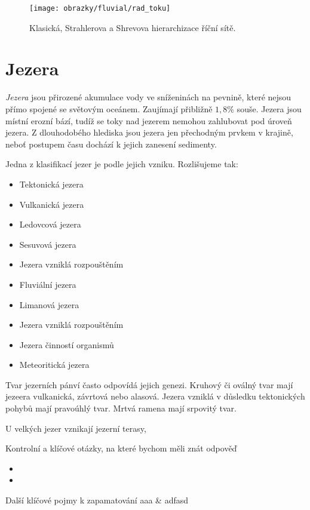 \begin{figure}
	\centering
	\texttt{[image: obrazky/fluvial/rad\_toku]}
	\caption{Klasická, Strahlerova a Shrevova hierarchizace říční sítě.}
	\label{fig:radtoku}
\end{figure}


\section{Jezera}
\emph{Jezera} jsou přirozené akumulace vody ve sníženinách na pevnině, které nejsou přímo spojené se světovým oceánem. Zaujímají přibližně $1,8 \%$ souše. Jezera jsou místní erozní bází, tudíž se toky nad jezerem nemohou zahlubovat pod úroveň jezera. Z dlouhodobého hlediska jsou jezera jen přechodným prvkem v krajině, neboť postupem času dochází k jejich zanesení sedimenty. 

Jedna z klasifikací jezer je podle jejich vzniku. Rozlišujeme tak:
\begin{itemize}
	\item Tektonická jezera	
	\item Vulkanická jezera
	\item Ledovcová jezera
	\item Sesuvová jezera
	\item Jezera vzniklá rozpouštěním
	\item Fluviální jezera
	\item Limanová jezera
	\item Jezera vzniklá rozpouštěním
	\item Jezera činností organismů
	\item Meteoritická jezera
\end{itemize}

Tvar jezerních pánví často odpovídá jejich genezi. Kruhový či oválný tvar mají jezeera vulkanická, závrtová nebo alasová. Jezera vzniklá v důsledku tektonických pohybů mají pravoúhlý tvar. Mrtvá ramena mají srpovitý tvar.


U velkých jezer vznikají jezerní terasy,





\newpage
\onecolumn
\begin{boxotazky}{Kontrolní a klíčové otázky, na které bychom měli znát odpověď}
	\begin{itemize}
		\item 
		\item 
		
	\end{itemize}
\end{boxotazky}

\begin{boxslovnik}{Další klíčové pojmy k zapamatování}
	aaa & adfasd \\
	
\end{boxslovnik}
\twocolumn

